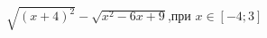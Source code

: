 \begin{ex}[type=calculate_expression]
	\begin{condition}
		\( \sqrt{(x+4)^2}-\sqrt{x^2-6x+9} \),\quad при \( x\in[-4;3]\)
	\end{condition}
\end{ex}